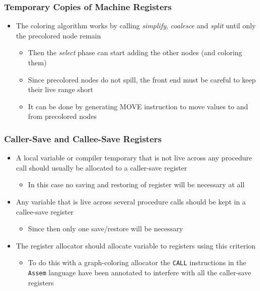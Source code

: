 \documentclass[11pt]{article}
\begin{document}
\subsubsection{Temporary Copies of Machine Registers}
\label{sec:orgb595930}
\begin{itemize}
\item The coloring algorithm works by calling  \emph{simplify}, \emph{coalesce} and \emph{split} until only the precolored node remain
\begin{itemize}
\item Then the \emph{select} phase can start adding the other nodes (and coloring them)
\item Since precolored nodes do not spill, the front end must be careful to keep their live range short
\item It can be done by generating MOVE instruction to move values to and from precolored nodes
\end{itemize}
\end{itemize}

\subsubsection{Caller-Save and Callee-Save Registers}
\label{sec:org0c52025}
\begin{itemize}
\item A local variable or compiler temporary that is not live across any procedure call should usually be allocated to a caller-save register
\begin{itemize}
\item In this case no saving and restoring of register will be necessary at all
\end{itemize}

\item Any variable that is live across several procedure calls should be kept in a callee-save register
\begin{itemize}
\item Since then only one save/restore will be necessary
\end{itemize}

\item The register allocator should allocate variable to registers using this criterion
\begin{itemize}
\item To do this with a graph-coloring allocator the \texttt{CALL} instructions in the \texttt{Assem} language have been annotated to interfere with all the caller-save registers
\end{itemize}
\end{itemize}
\end{document}
